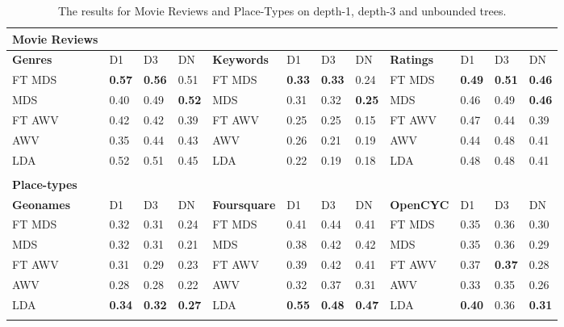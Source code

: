 \begin{table}[t]
	\centering
	\small
	\setlength{\tabcolsep}{7pt}
	\renewcommand{\arraystretch}{1.1}
	\begin{tabularx}{\textwidth}{llllllllllll}
		\toprule{}
		\textbf{Movie Reviews} &      &      &      &            &      &      &      &                &      &      &      \\
		\midrule{}
		\textbf{Genres}        & D1   & D3   & DN   & \textbf{Keywords}   & D1   & D3   & DN   & \textbf{Ratings}        & D1   & D3   & DN   \\
		\midrule{}FT MDS        & \textbf{0.57} & \textbf{0.56} & 0.51 & FT MDS     & \textbf{0.33} & \textbf{0.33} & 0.24 & FT MDS         & \textbf{0.49} & \textbf{0.51} & \textbf{0.46} \\
		MDS           & 0.40 & 0.49 & \textbf{0.52} & MDS        & 0.31 & 0.32 & \textbf{0.25} & MDS            & 0.46 & 0.49 & \textbf{0.46} \\
		FT AWV        & 0.42 & 0.42 & 0.39 & FT AWV     & 0.25 & 0.25 & 0.15 & FT AWV         & 0.47 & 0.44 & 0.39 \\
		AWV           & 0.35 & 0.44 & 0.43 & AWV        & 0.26 & 0.21 & 0.19 & AWV            & 0.44 & 0.48 & 0.41 \\
		LDA           & 0.52 & 0.51 & 0.45 & LDA        & 0.22 & 0.19 & 0.18 & LDA            & 0.48 & 0.48 & 0.41 \\
		&      &      &      &            &      &      &      &                &      &      &      \\
		\toprule
		\textbf{Place-types}   &      &      &      &            &      &      &      &                &      &      &      \\
		\midrule{}
		\textbf{Geonames}      & D1   & D3   & DN   & \textbf{Foursquare} & D1   & D3   & DN   & \textbf{OpenCYC}        & D1   & D3   & DN   \\
		\midrule{}FT MDS        & 0.32 & 0.31 & 0.24 & FT MDS     & 0.41 & 0.44 & 0.41 & FT MDS         & 0.35 & 0.36 & 0.30 \\
		MDS           & 0.32 & 0.31 & 0.21 & MDS        & 0.38 & 0.42 & 0.42 & MDS            & 0.35 & 0.36 & 0.29 \\
		FT AWV        & 0.31 & 0.29 & 0.23 & FT AWV     & 0.39 & 0.42 & 0.41 & FT AWV         & 0.37 & \textbf{0.37} & 0.28 \\
		AWV           & 0.28 & 0.28 & 0.22 & AWV        & 0.32 & 0.37 & 0.31 & AWV            & 0.33 & 0.35 & 0.26 \\
		LDA           & \textbf{0.34} & \textbf{0.32} & \textbf{0.27} & LDA        & \textbf{0.55} & \textbf{0.48} & \textbf{0.47} & LDA            & \textbf{0.40} & 0.36 & \textbf{0.31} \\
		\bottomrule{}
	\end{tabularx}
	
	\caption{The results for Movie Reviews and Place-Types on depth-1, depth-3 and unbounded trees. \label{tabResultsMoviePlaces}}
\end{table}

